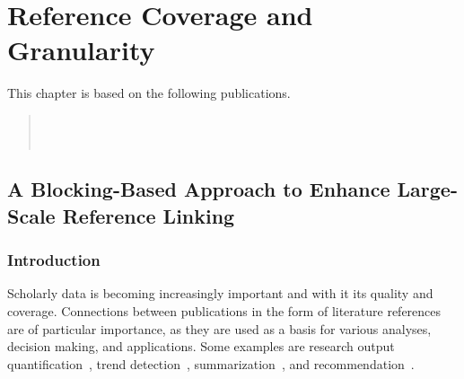 \chapter{Reference Coverage and Granularity}

This chapter is based on the following publications.
\begin{quote}
\\
\\
\end{quote}


\section{A Blocking-Based Approach to Enhance Large-Scale Reference Linking}

\subsection{Introduction}
Scholarly data is becoming increasingly important and with it its quality and coverage. Connections between publications in the form of literature references are of particular importance, as they are used as a basis for various analyses, decision making, and applications. Some examples are research output quantification~\cite{Hirsch2005}, trend detection~\cite{Chen2006}, summarization~\cite{Elkiss2008}, and recommendation~\cite{Ma2020,Faerber202x}.

